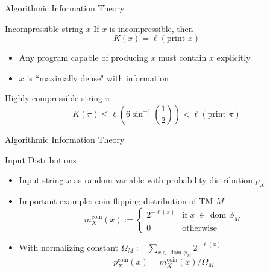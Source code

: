 \documentclass{beamer}
\begin{document}
\begin{frame}{Algorithmic Information Theory}
\begin{block}{Incompressible string $x$}
If $x$ is incompressible, then 
\begin{equation*}
    K(x) = \ell(\text{print }x)
\end{equation*}
\begin{itemize}
    \item Any program capable of producing $x$ must contain $x$ explicitly
    \item $x$ is ``maximally dense" with information
\end{itemize}
\end{block}
 \begin{block}{Highly compressible string $\pi$}
    \begin{equation*}
        K(\pi) \le \ell \left( 6\sin^{-1}\left(\frac{1}{2}\right)\right) < \ell( \text{print }\pi)
    \end{equation*}
    \end{block}
\end{frame}

\begin{frame}{Algorithmic Information Theory}
\begin{block}{Input Distributions}
\begin{itemize}
    \item Input string $x$ as random variable with probability distribution $p_X$
    \item Important example: coin flipping distribution of TM $M$
    \begin{equation*}
        m_X^\text{coin}(x) := \begin{cases} 2^{-\ell(x)} &\text{if $x\;\in$ dom $\phi_M$}\\ 0 &\text{otherwise}\end{cases}
    \end{equation*}
    \item With normalizing constant $\Omega_M :=\sum_{x\in\text{ dom }\phi_M} 2^{-\ell(x)}$
    \begin{equation*}
        p_X^\text{coin}(x) = m_X^\text{coin}(x)/\Omega_M
    \end{equation*}
\end{itemize}
\end{block}
\end{frame}
\end{document}
